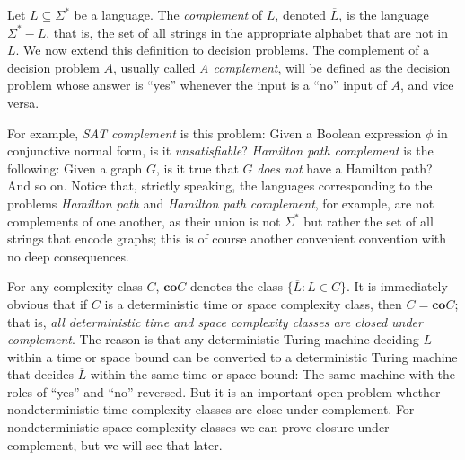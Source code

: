 \documentclass[12pt]{article}
\begin{document}
\begin{defbox}
  
  Let $L \subseteq \Sigma^*$ be a language. The \textit{complement} of $L$, denoted $\overline{L}$, is the language $\Sigma^* - L$, that is, the set of all strings in the appropriate alphabet that are not in $L$. We now extend this definition to decision problems. The complement of a decision problem $A$, usually called \textit{A complement}, will be defined as the decision problem whose answer is ``yes'' whenever the input is a ``no'' input of $A$, and vice versa. 
\end{defbox}
  
For example, \textit{SAT complement} is this problem: Given a Boolean expression $\phi$ in conjunctive normal form, is it \textit{unsatisfiable}? \textit{Hamilton path complement} is the following: Given a graph $G$, is it true that $G$ \textit{does not} have a Hamilton path? And so on. Notice that, strictly speaking, the languages corresponding to the problems \textit{Hamilton path} and \textit{Hamilton path complement}, for example, are not complements of one another, as their union is not $\Sigma^*$ but rather the set of all strings that encode graphs; this is of course another convenient convention with no deep consequences.

\begin{defbox}
  
  For any complexity class $C$, $\textbf{co}C$ denotes the class $\{\overline{L} : L \in C\}$. It is immediately obvious that if $C$ is a deterministic time or space complexity class, then $C = \textbf{co}C$; that is, \textit{all deterministic time and space complexity classes are closed under complement}. The reason is that any deterministic Turing machine deciding $L$ within a time or space bound can be converted to a deterministic Turing machine that decides $\overline{L}$ within the same time or space bound: The same machine with the roles of ``yes'' and ``no'' reversed. But it is an important open problem whether nondeterministic time complexity classes are close under complement. For nondeterministic space complexity classes we can prove closure under complement, but we will see that later. 
\end{defbox}
\end{document}
